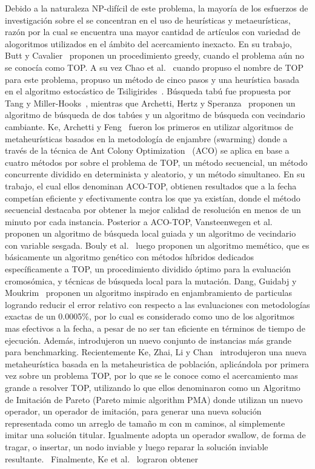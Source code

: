 Debido a la naturaleza NP-dif\'icil de este problema, la mayor\'ia de los esfuerzos de investigaci\'on sobre el se concentran en el uso de heur\'isticas y metaeur\'isticas, raz\'on por la cual se encuentra una mayor cantidad de art\'iculos con variedad de alogoritmos utilizados en el \'ambito del acercamiento inexacto. En su trabajo, Butt y Cavalier~\cite{BUTT1994101} proponen un procedimiento greedy, cuando el problema a\'un no se conoc\'ia como TOP. A su vez Chao et al.~\cite{TOPresume} cuando propuso el nombre de TOP para este problema, propuso un m\'etodo de cinco pasos y una heur\'istica basada en el algoritmo estoc\'astico de Tsiligirides~\cite{Tsiligirides1984}. B\'usqueda tab\'u fue propuesta por Tang y Miller-Hooks~\cite{TANG20051379}, mientras que Archetti, Hertz y Speranza~\cite{Archetti2007} proponen un algoritmo de b\'usqueda de dos tab\'ues y un algoritmo de b\'usqueda con vecindario cambiante. Ke, Archetti y Feng~\cite{KE2008648} fueron los primeros en utilizar algoritmos de metaheur\'isticas basados en la metodolog\'ia de enjambre (swarming) donde a trav\'es de la t\'ecnica de Ant Colony Optimization~\cite{dorigo2011ant} (ACO) se aplica en base a cuatro m\'etodos por sobre el problema de TOP, un m\'etodo secuencial, un m\'etodo concurrente dividido en determinista y aleatorio, y un m\'etodo simultaneo. En su trabajo, el cual ellos denominan ACO-TOP, obtienen resultados que a la fecha compet\'ian eficiente y efectivamente contra los que ya exist\'ian, donde el m\'etodo secuencial destacaba por obtener la mejor calidad de resoluci\'on en menos de un minuto por cada instancia. Posterior a ACO-TOP, Vansteenwegen et al.~\cite{VANSTEENWEGEN2009118} proponen un algoritmo de b\'usqueda local guiada y un algoritmo de vecindario con variable sesgada. Bouly et al.~\cite{Bouly2010} luego proponen un algoritmo mem\'etico, que es b\'asicamente un algoritmo gen\'etico con m\'etodos h\'ibridos dedicados espec\'ificamente a TOP, un procedimiento dividido \'optimo para la evaluaci\'on cromos\'omica, y t\'ecnicas de b\'usqueda local para la mutaci\'on. Dang, Guidabj y Moukrim~\cite{dang2013effective} proponen un algoritmo inspirado en enjambramiento de particulas logrando reducir el error relativo con respecto a las evaluaciones con metodolog\'ias exactas de un 0.0005\%, por lo cual es considerado como uno de los algoritmos mas efectivos a la fecha, a pesar de no ser tan eficiente en t\'erminos de tiempo de ejecuci\'on. Adem\'as, introdujeron un nuevo conjunto de instancias m\'as grande para benchmarking. Recientemente Ke, Zhai, Li y Chan~\cite{KE2016155} introdujeron una nueva metaheur\'istica basada en la metaheuristica de poblaci\'on, aplic\'andola por primera vez sobre un problema TOP, por lo que se le conoce como el acercamiento mas grande a resolver TOP, utilizando lo que ellos denominaron como un Algoritmo de Imitaci\'on de Pareto (Pareto mimic algorithm PMA) donde utilizan un nuevo operador, un operador de imitaci\'on, para generar una nueva soluci\'on representada como un arreglo de tama\~no m con m caminos, al simplemente imitar una soluci\'on titular. Igualmente adopta un operador swallow, de forma de tragar, o insertar, un nodo inviable y luego reparar la soluci\'on inviable resultante.~\cite{GUNAWAN2016315} Finalmente, Ke et al.~\cite{KE2016155} lograron obtener 